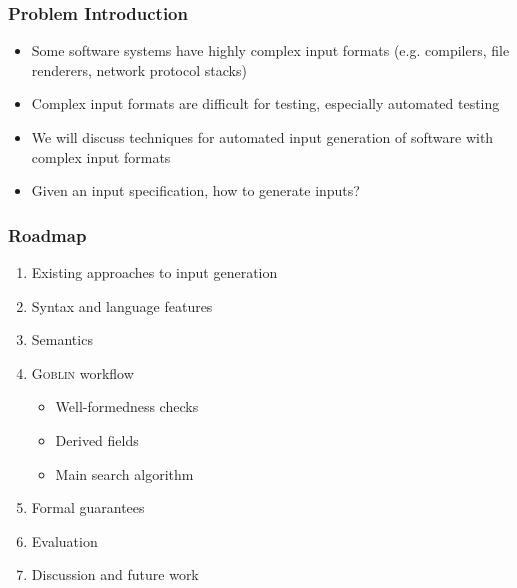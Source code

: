 \documentclass[11pt,xcolor={dvipsnames},hyperref={pdftex,pdfpagemode=UseNone,hidelinks,pdfdisplaydoctitle=true},usepdftitle=false]{beamer}
\newcommand{\system}{\textsc{Goblin}}
\newcommand{\green}[1]{\textcolor{green!60!black}{#1}}
\begin{document}
\begin{frame} 
    \frametitle{Problem Introduction} %
    \begin{itemize}
        \item Some software systems have highly \green{complex input formats} (e.g. compilers, file renderers, network protocol stacks) \pause
        \item Complex input formats are difficult for testing, especially \green{automated testing} \pause
        \item We will discuss techniques for \green{automated input generation} of software with complex input formats \pause
        \item Given an input specification, how to generate inputs?
    \end{itemize}
\end{frame}

\begin{frame}\frametitle{Roadmap} 
\begin{enumerate}
  \item Existing approaches to input generation
  \item Syntax and language features
  \item Semantics 
  \item \system{} workflow
  \begin{itemize}
    \item Well-formedness checks
    \item Derived fields
    \item Main search algorithm
  \end{itemize}
  \item Formal guarantees
  \item Evaluation
  \item Discussion and future work
\end{enumerate}
\end{frame} 
\end{document}
